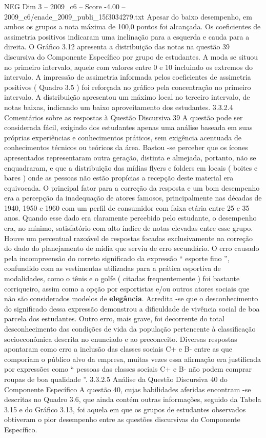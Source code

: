 \begin{textsample}{NEG Dim 3 – 2009\_c6 – Score -4.00 – 2009\_c6/enade\_2009\_publi\_15f3034279.txt}
Apesar do baixo desempenho, em ambos os grupos a nota máxima de 100,0 pontos foi alcançada.
Os coeficientes de assimetria positivos indicaram uma inclinação para a esquerda e cauda para a direita.
O Gráfico 3.12 apresenta a distribuição das notas na questão 39 discursiva do Componente Específico por grupo de estudantes.
A moda se situou no primeiro intervalo, aquele com valores entre 0 e 10 incluindo os extremos do intervalo.
A impressão de assimetria informada pelos coeficientes de assimetria positivos ( Quadro 3.5 ) foi reforçada no gráfico pela concentração no primeiro intervalo.
A distribuição apresentou um máximo local no terceiro intervalo, de notas baixas, indicando um baixo aproveitamento dos estudantes. 3.3.2.4 Comentários sobre as respostas à Questão Discursiva 39 A questão pode ser considerada fácil, exigindo dos estudantes apenas uma análise baseada em suas próprias experiências e conhecimentos práticos, sem exigência acentuada de conhecimentos técnicos ou teóricos da área.
Bastou -se perceber que os ícones apresentados representaram outra geração, distinta e almejada, portanto, não se enquadraram, e que a distribuição das mídias flyers e folders em locais ( boites e bares ) onde as pessoas não estão propícias a recepção deste material era equivocada.
O principal fator para a correção da resposta e um bom desempenho era a percepção da inadequação de atores famosos, principalmente nas décadas de 1940, 1950 e 1960 com um perfil de consumidor com faixa etária entre 25 e 35 anos.
Quando esse dado era claramente percebido pelo estudante, o desempenho era, no mínimo, satisfatório com alto índice de notas elevadas entre esse grupo.
Houve um percentual razoável de respostas focadas exclusivamente na correção do dado do planejamento de mídia que serviu de erro secundário.
O erro causado pela incompreensão do correto significado da expressão “ esporte fino ”, confundido com as vestimentas utilizadas para a prática esportiva de modalidades, como o tênis e o golfe ( citadas frequentemente ) foi bastante corriqueiro, assim como a opção por esportistas e/ou outros atores sociais que não são considerados modelos de \textbf{elegância}.
Acredita -se que o desconhecimento do significado dessa expressão demonstrou a dificuldade de vivência social de boa parcela dos estudantes.
Outro erro, mais grave, foi decorrente do total desconhecimento das condições de vida da população pertencente à classificação socioeconômica descrita no enunciado e ao preconceito.
Diversas respostas apontaram como erro a inclusão das classes sociais C+ e B- entre as que comporiam o público alvo da empresa, muitas vezes essa afirmação era justificada por expressões como “ pessoas das classes sociais C+ e B- não podem comprar roupas de boa qualidade ”. 3.3.2.5 Análise da Questão Discursiva 40 do Componente Específico A questão 40, cujas habilidades aferidas encontram -se descritas no Quadro 3.6, que ainda contém outras informações, seguido da Tabela 3.15 e do Gráfico 3.13, foi aquela em que os grupos de estudantes observados obtiveram o pior desempenho entre as questões discursivas do Componente Específico.

\end{textsample}
